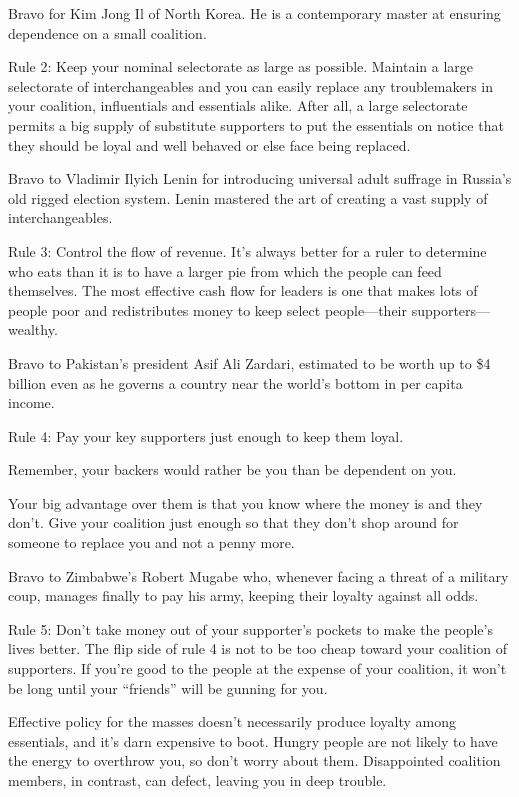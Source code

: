 \documentclass[10pt]{article}
\begin{document}
{\large Bravo for Kim Jong Il of North Korea. He is a contemporary master at
ensuring dependence on a small coalition.}

{\large Rule 2: Keep your nominal selectorate as large as possible. Maintain a
large selectorate of interchangeables and you can easily replace any
troublemakers in your coalition, influentials and essentials alike. After all, a
large selectorate permits a big supply of substitute supporters to put the
essentials on notice that they should be loyal and well behaved or else face
being replaced.}

{\large Bravo to Vladimir Ilyich Lenin for introducing universal adult suffrage
in Russia's old rigged election system. Lenin mastered the art of creating a vast
supply of interchangeables.}

{\large Rule 3: Control the flow of revenue. It's always better for a ruler to
determine who eats than it is to have a larger pie from which the people can feed
themselves. The most effective cash flow for leaders is one that makes lots of
people poor and redistributes money to keep select people---their
supporters---wealthy.}

{\large Bravo to Pakistan's president Asif Ali Zardari, estimated to be worth up
to \$4 billion even as he governs a country near the world's bottom in per capita
income.}

{\large Rule 4: Pay your key supporters just enough to keep them loyal.}

{\large Remember, your backers would rather be you than be dependent on you.}

{\large Your big advantage over them is that you know where the money is and
they don't. Give your coalition just enough so that they don't shop around for
someone to replace you and not a penny more.}

{\large Bravo to Zimbabwe's Robert Mugabe who, whenever facing a threat of a
military coup, manages finally to pay his army, keeping their loyalty against all
odds.}

{\large Rule 5: Don't take money out of your supporter's pockets to make the
people's lives better. The flip side of rule 4 is not to be too cheap toward your
coalition of supporters. If you're good to the people at the expense of your
coalition, it won't be long until your ``friends'' will be gunning for you.}

{\large Effective policy for the masses doesn't necessarily produce loyalty
among essentials, and it's darn expensive to boot. Hungry people are not likely
to have the energy to overthrow you, so don't worry about them. Disappointed
coalition members, in contrast, can defect, leaving you in deep trouble.}
\end{document}
